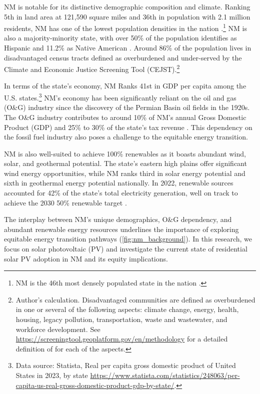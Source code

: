 \documentclass[11pt,twoside,letterpaper]{article}
\begin{document}
NM is notable for its distinctive demographic composition and climate. Ranking 5th in land area at 121,590 square miles and 36th in population with 2.1 million residents, NM has one of the lowest population densities in the nation \parencite{uscensus2022}.\footnote{NM is the 46th most densely populated state in the nation \parencite{uscensus2022}.} NM is also a majority-minority state, with over 50\% of the population identifies as Hispanic and 11.2\% as Native American \parencite{uscensus2020}.  Around 86\% of the population lives in disadvantaged census tracts defined as overburdened and under-served by the Climate and Economic Justice Screening Tool (CEJST).\footnote{Author's calculation. Disadvantaged communities are defined as overburdened in one or several of the following aspects: climate change, energy, health, housing, legacy pollution, transportation, waste and wastewater, and workforce development. See \url{https://screeningtool.geoplatform.gov/en/methodology} for a detailed definition of for each of the aspects.} 

In terms of the state's economy, NM Ranks 41st in GDP per capita among the U.S. states.\footnote{Data source: Statista, Real per capita gross domestic product of United States in 2023, by state \url{https://www.statista.com/statistics/248063/per-capita-us-real-gross-domestic-product-gdp-by-state/}.} NM's economy has been significantly reliant on the oil and gas (O\&G) industry since the discovery of the Permian Basin oil fields in the 1920s. The O\&G industry contributes to around 10\% of NM's annual Gross Domestic Product (GDP) and 25\% to 30\% of the state's tax revenue \parencite{eia2023nm, nmlegislative2023}. This dependency on the fossil fuel industry also poses a challenge to the equitable energy transition.

NM is also well-suited to achieve 100\% renewables as it boasts abundant wind, solar, and geothermal potential. The state's eastern high plains offer significant wind energy opportunities, while NM ranks third in solar energy potential and sixth in geothermal energy potential nationally. In 2022, renewable sources accounted for 42\% of the state's total electricity generation, well on track to achieve the 2030 50\% renewable target \parencite{eia2023energy}.

The interplay between NM's unique demographics, O\&G dependency, and abundant renewable energy resources underlines the importance of exploring equitable energy transition pathways (\autoref{fig:nm_background}). In this research, we focus on solar photovoltaic (PV) and investigate the current state of residential solar PV adoption in NM and its equity implications. 
\end{document}
